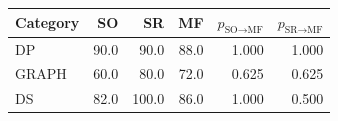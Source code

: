 \begin{tabular}{@{}lrrrrr@{}}
\toprule
Category & SO & SR & MF & $p_{\text{SO}\to\text{MF}}$ & $p_{\text{SR}\to\text{MF}}$ \\
\midrule
DP & 90.0 & 90.0 & 88.0 & 1.000 & 1.000 \\
GRAPH & 60.0 & 80.0 & 72.0 & 0.625 & 0.625 \\
DS & 82.0 & 100.0 & 86.0 & 1.000 & 0.500 \\
\bottomrule
\end{tabular}
